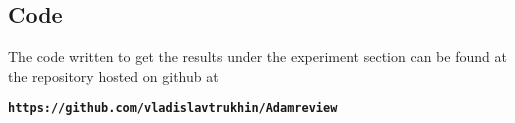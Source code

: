 \documentclass[nohyperref]{article}
\theoremstyle{plain}
\theoremstyle{definition}
\theoremstyle{remark}
\begin{document}
\subsection{Code}
The code written to get the results under the experiment section can be found at the repository hosted on github at
\begin{center}
\textbf{\texttt{https://github.com/vladislavtrukhin/Adamreview}}
\end{center}


\end{document}
